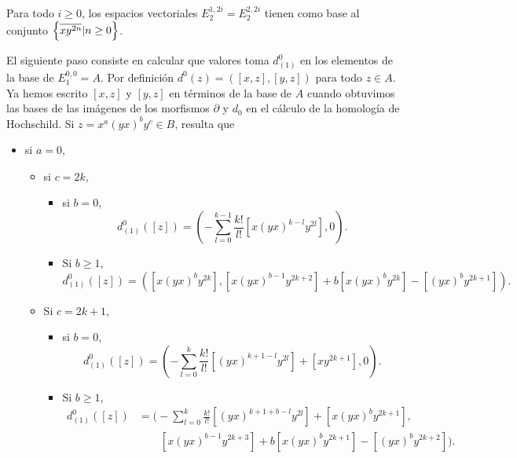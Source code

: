 \documentclass[fleqn,../tesis.tex]{subfiles}
\begin{document}
\begin{coro}
    Para todo $i \geq 0$, los espacios vectoriales $E_{2}^{1, 2i} = E_{2}^{2, 2i}$ tienen como base
    al conjunto
       $\left\lbrace \overline{xy^{2n}} | n \geq 0 \right\rbrace$.
\end{coro}

El siguiente paso consiste en calcular que valores toma $d_{(1)}^{0}$ en los elementos de la base de $E^{0, 0}_{1} = A$.
Por definición $d^{0}(z) = \left([x,z], [y,z]\right)$ para todo $z \in A$. Ya hemos escrito $[x, z]$ y $[y, z]$ en términos de la base de $A$
 cuando obtuvimos las bases de las imágenes de los morfismos $\partial$ y $d_0$ en el cálculo
de la homología de Hochschild. Si $z  = x^a(yx)^by^c\in B$, resulta que
\begin{itemize}
    \item si $a = 0$,
    \begin{itemize}
        \item si $c = 2k$,
        \begin{itemize}
            \item si $b = 0$,
            \[
                d^{0}_{(1)}([z]) = \left(-\sum_{l = 0}^{k -1}\frac{k!}{l!}\left[x(yx)^{k - l}y^{2l}\right], 0\right).
            \]
            \item Si $b \geq 1$,
            \[
                d^0_{(1)}([z]) = \left(\left[x(yx)^by^{2k}\right],\left[x(yx)^{b - 1}y^{2k + 2}\right]
                    + b\left[x(yx)^{b}y^{2k}\right] - \left[(yx)^{b}y^{2k + 1}\right]\right).
            \]
        \end{itemize}
        \item Si $c = 2k + 1$,
        \begin{itemize}
            \item si $b = 0$,
            \[
                d^{0}_{(1)}([z]) = \left(-\sum_{l = 0}^{k}\frac{k!}{l!}\left[(yx)^{k + 1 - l}y^{2l}\right] + \left[xy^{2k + 1}\right], 0\right).
            \]
            \item Si $b \geq 1$,
            \begin{align*}
                d^{0}_{(1)}([z]) &= \Bigg(-\sum_{l = 0}^{k}\frac{k!}{l!}\left[(yx)^{k + 1 + b - l}y^{2l}\right]
                    + \left[x(yx)^{b}y^{2k + 1}\right],\\
                &\qquad \left[x(yx)^{b - 1}y^{2k + 3}\right]
                    + b\left[x(yx)^{b}y^{2k + 1}\right] - \left[(yx)^{b}y^{2k + 2}\right]\Bigg).
            \end{align*}
        \end{itemize}

\end{itemize}
\end{itemize}
\end{document}
